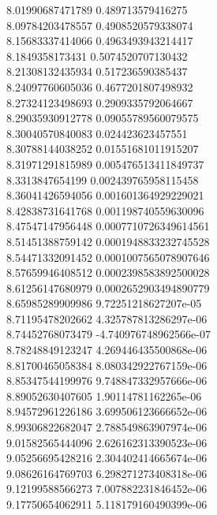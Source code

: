 {8.01990687471789 0.489713579416275 \\
8.09784203478557 0.4908520579338074 \\
8.15683337414066 0.4963493943214417 \\
8.1849358173431 0.5074520707130432 \\
8.21308132435934 0.517236590385437 \\
8.24097760605036 0.4677201807498932 \\
8.27324123498693 0.2909335792064667 \\
8.29035930912778 0.09055789560079575 \\
8.30040570840083 0.024423623457551 \\
8.30788144038252 0.01551681011915207 \\
8.31971291815989 0.005476513411849737 \\
8.3313847654199 0.002439765958115458 \\
8.36041426594056 0.001601364929229021 \\
8.42838731641768 0.001198740559630096 \\
8.47547147956448 0.0007710726349614561 \\
8.51451388759142 0.0001948833232745528 \\
8.54471332091452 0.0001007565078907646 \\
8.57659946408512 0.0002398583892500028 \\
8.61256147680979 0.0002652903494890779 \\
8.65985289909986 9.72251218627207e-05 \\
8.71195478202662 4.325787813286297e-06 \\
8.74452768073479 -4.740976748962566e-07 \\
8.78248849123247 4.269446435500868e-06 \\
8.81700465058384 8.080342922767159e-06 \\
8.85347544199976 9.748847332957666e-06 \\
8.89052630407605 1.90114781162265e-06 \\
8.94572961226186 3.699506123666652e-06 \\
8.99306822682047 2.788549863907974e-06 \\
9.01582565444096 2.626162313390523e-06 \\
9.05256695428216 2.304402414665674e-06 \\
9.08626164769703 6.298271273408318e-06 \\
9.12199588566273 7.007882231846452e-06 \\
9.17750654062911 5.118179160490399e-06 \\
}
